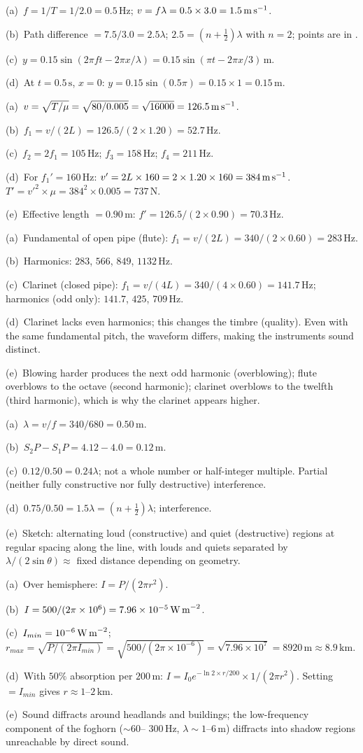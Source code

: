 \begingroup
\let\textbf\AnswersTextbf
\setlength{\parindent}{0pt}
\def\quad{\par\smallskip}

\textbf{B1.}
(a)~$f=1/T=1/2.0=0.5\,\text{Hz}$;
$v=f\lambda=0.5\times3.0=1.5\,\text{m\,s}^{-1}$. \quad
(b)~Path difference $=7.5/3.0=2.5\lambda$;
$2.5=(n+\tfrac{1}{2})\lambda$ with $n=2$;
points are in \textbf{antiphase}. \quad
(c)~$y=0.15\sin(2\pi ft-2\pi x/\lambda)
=0.15\sin(\pi t-2\pi x/3)\,\text{m}$. \quad
(d)~At $t=0.5\,\text{s}$, $x=0$:
$y=0.15\sin(0.5\pi)=0.15\times1=0.15\,\text{m}$.

\textbf{B2.}
(a)~$v=\sqrt{T/\mu}=\sqrt{80/0.005}=\sqrt{16000}
=126.5\,\text{m\,s}^{-1}$. \quad
(b)~$f_1=v/(2L)=126.5/(2\times1.20)=52.7\,\text{Hz}$. \quad
(c)~$f_2=2f_1=105\,\text{Hz}$; $f_3=158\,\text{Hz}$;
$f_4=211\,\text{Hz}$. \quad
(d)~For $f_1'=160\,\text{Hz}$: $v'=2L\times160
=2\times1.20\times160=384\,\text{m\,s}^{-1}$.
$T'=v'^2\times\mu=384^2\times0.005=737\,\text{N}$. \quad
(e)~Effective length $=0.90\,\text{m}$:
$f'=126.5/(2\times0.90)=70.3\,\text{Hz}$.

\textbf{B3.}
(a)~Fundamental of open pipe (flute):
$f_1=v/(2L)=340/(2\times0.60)=283\,\text{Hz}$. \quad
(b)~Harmonics: $283$, $566$, $849$, $1132\,\text{Hz}$.
\quad
(c)~Clarinet (closed pipe):
$f_1=v/(4L)=340/(4\times0.60)=141.7\,\text{Hz}$;
harmonics (odd only): $141.7$, $425$, $709\,\text{Hz}$. \quad
(d)~Clarinet lacks even harmonics; this changes the
timbre (quality). Even with the same fundamental pitch,
the waveform differs, making the instruments sound
distinct. \quad
(e)~Blowing harder produces the next odd harmonic
(overblowing); flute overblows to the octave (second
harmonic); clarinet overblows to the twelfth (third
harmonic), which is why the clarinet appears higher.

\textbf{B4.}
(a)~$\lambda=v/f=340/680=0.50\,\text{m}$. \quad
(b)~$S_2P-S_1P=4.12-4.0=0.12\,\text{m}$. \quad
(c)~$0.12/0.50=0.24\lambda$; not a whole number
or half-integer multiple. Partial (neither fully
constructive nor fully destructive) interference. \quad
(d)~$0.75/0.50=1.5\lambda=(n+\tfrac{1}{2})\lambda$;
\textbf{destructive} interference. \quad
(e)~Sketch: alternating loud (constructive) and
quiet (destructive) regions at regular spacing along
the line, with louds and quiets separated by
$\lambda/(2\sin\theta)\approx$ fixed distance depending
on geometry.

\textbf{B5.}
(a)~Over hemisphere: $I=P/(2\pi r^2)$. \quad
(b)~$I=500/(2\pi\times10^6)=7.96\times10^{-5}
\,\text{W\,m}^{-2}$. \quad
(c)~$I_{min}=10^{-6}\,\text{W\,m}^{-2}$;
$r_{max}=\sqrt{P/(2\pi I_{min})}
=\sqrt{500/(2\pi\times10^{-6})}
=\sqrt{7.96\times10^7}=8920\,\text{m}\approx8.9\,\text{km}$.
\quad
(d)~With $50\%$ absorption per $200\,\text{m}$:
$I=I_0e^{-\ln2\times r/200}\times 1/(2\pi r^2)$.
Setting $=I_{min}$ gives $r\approx1$--$2\,\text{km}$.
\quad
(e)~Sound diffracts around headlands and buildings;
the low-frequency component of the foghorn ($\sim60$--
$300\,\text{Hz}$, $\lambda\sim1$--$6\,\text{m}$)
diffracts into shadow regions unreachable by direct
sound.

